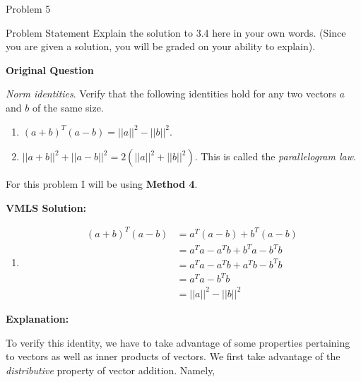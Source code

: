 \begin{problem}{Problem 5}
    \begin{statement}{Problem Statement}
        Explain the solution to 3.4 here in your own words. (Since you are given a solution, you will be graded on your ability to explain). \vspace*{1em}

        \textbf{Original Question} \vspace*{1em}

        \textit{Norm identities}. Verify that the following identities hold for any two vectors $a$ and $b$ of the same size.

        \begin{enumerate}[label=(\alph*)]
            \item $(a+b)^{T}(a-b) = ||a||^{2} - ||b||^{2}$.
            \item $||a+b||^{2} + ||a-b||^{2} = 2(||a||^{2}+||b||^{2})$. This is called the \textit{parallelogram law}.
        \end{enumerate}
    \end{statement}

    \begin{Highlight}
        For this problem I will be using \textbf{Method 4}. \vspace*{1em}

        \textbf{VMLS Solution:}

        \begin{enumerate}[label=(\alph*)]
            \item 
            \begin{align*}
                (a+b)^{T}(a-b) & = a^{T}(a-b) + b^{T}(a-b) \\
                & = a^{T}a - a^{T}b + b^{T}a - b^{T}b \\
                & = a^{T}a - a^{T}b + a^{T}b - b^{T}b \\
                & = a^{T}a - b^{T}b \\
                & = ||a||^{2} - ||b||^{2}
            \end{align*}
        \end{enumerate}

        \textbf{Explanation:} \vspace*{1em}

        To verify this identity, we have to take advantage of some properties pertaining to vectors as well as inner products of vectors. We first take advantage of the \textit{distributive} property
        of vector addition. Namely,


\end{Highlight}
\end{problem}
